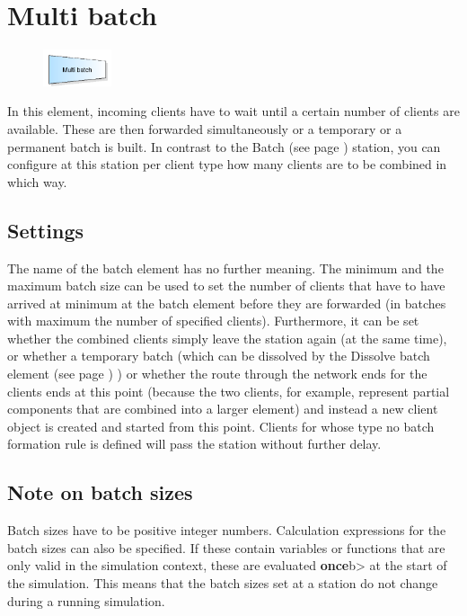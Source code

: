 \section{Multi batch}
\label{ref:ModelElementBatchMulti}

\begin{figure}
\vspace{-22pt}
\includegraphics[width=2cm]{imageModelElementBatchMulti.png}
\vspace{-22pt}
\end{figure}

In this element, incoming clients have to wait until a certain number of clients are available.
These are then forwarded simultaneously or a temporary or a permanent batch is built.
In contrast to the Batch (see page \pageref{ref:ModelElementBatch}) station, you can configure
at this station per client type how many clients are to be combined in which way.

\subsection*{Settings}

The name of the batch element has no further meaning. The minimum and the maximum batch size can be used
to set the number of clients that have to have arrived at minimum at the batch element before they are
forwarded (in batches with maximum the number of specified clients). Furthermore, it can be set whether
the combined clients simply leave the station again (at the same time), or whether a temporary batch (which
can be dissolved by the Dissolve batch element (see page \pageref{ref:ModelElementSeparate}) ) or whether the route
through the network ends for the clients ends at this point (because the two clients, for example, represent
partial components that are combined into a larger element) and instead a new client object is created and
started from this point.
Clients for whose type no batch formation rule is defined will pass the station without further delay.

\subsection*{Note on batch sizes}

Batch sizes have to be positive integer numbers.
Calculation expressions for the batch sizes can also be specified.
If these contain variables or functions that are only valid in the simulation context, these are evaluated \textbf{once}b> at the start of the simulation.
This means that the batch sizes set at a station do not change during a running simulation.


